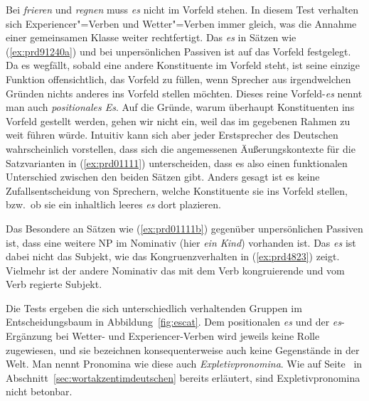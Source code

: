 Bei \textit{frieren} und \textit{regnen} muss \textit{es} nicht im Vorfeld stehen.
In diesem Test verhalten sich Experiencer"=Verben und Wetter"=Verben immer gleich, was die Annahme einer gemeinsamen Klasse weiter rechtfertigt.
Das \textit{es} in Sätzen wie (\ref{ex:prd91240a}) und bei unpersönlichen Passiven ist auf das Vorfeld festgelegt.
Da es wegfällt, sobald eine andere Konstituente im Vorfeld steht, ist seine einzige Funktion offensichtlich, das Vorfeld zu füllen, wenn Sprecher aus irgendwelchen Gründen nichts anderes ins Vorfeld stellen möchten.
Dieses reine Vorfeld-\textit{es} nennt man auch \textit{positionales Es}.
Auf die Gründe, warum überhaupt Konstituenten ins Vorfeld gestellt werden, gehen wir nicht ein, weil das im gegebenen Rahmen zu weit führen würde.
Intuitiv kann sich aber jeder Erstsprecher des Deutschen wahrscheinlich vorstellen, dass sich die angemessenen Äußerungskontexte für die Satzvarianten in (\ref{ex:prd01111}) unterscheiden, dass es also einen funktionalen Unterschied zwischen den beiden Sätzen gibt.
Anders gesagt ist es keine Zufallsentscheidung von Sprechern, welche Konstituente sie ins Vorfeld stellen, bzw.\ ob sie ein inhaltlich leeres \textit{es} dort plazieren.

\begin{exe}
  \ex\label{ex:prd01111} 
  \begin{xlist}
  \end{xlist}
\end{exe}

Das Besondere an Sätzen wie (\ref{ex:prd01111b}) gegenüber unpersönlichen Passiven ist, dass eine weitere NP im Nominativ (hier \textit{ein Kind}) vorhanden ist.
Das \textit{es} ist dabei nicht das Subjekt, wie das Kongruenzverhalten in (\ref{ex:prd4823}) zeigt.
Vielmehr ist der andere Nominativ das mit dem Verb kongruierende und vom Verb regierte Subjekt.

\begin{exe}
  \ex\label{ex:prd4823}
  \begin{xlist}
  \end{xlist}
\end{exe}

Die Tests ergeben die sich unterschiedlich verhaltenden Gruppen im Entscheidungsbaum in Abbildung~\ref{fig:escat}.
Dem positionalen \textit{es} und der \textit{es}-Ergänzung bei Wetter- und Experiencer-Verben wird jeweils keine Rolle zugewiesen, und sie bezeichnen konsequenterweise auch keine Gegenstände in der Welt.
Man nennt Pronomina wie diese auch \textit{Expletivpronomina}.
Wie auf Seite~\pageref{abs:expletbeton} in Abschnitt~\ref{sec:wortakzentimdeutschen} bereits erläutert, sind Expletivpronomina nicht betonbar.

